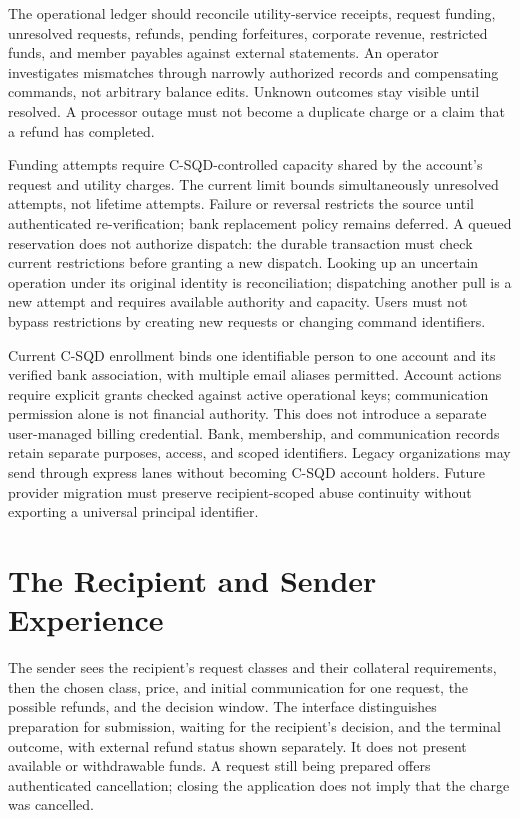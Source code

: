 \documentclass[11pt]{article}
\begin{document}
The operational ledger should reconcile utility-service receipts, request funding,
unresolved requests, refunds,
pending forfeitures, corporate revenue, restricted funds, and member payables
against external statements. An operator investigates mismatches through narrowly
authorized records and compensating commands, not arbitrary balance edits.
Unknown outcomes stay visible until resolved. A processor outage must not become
a duplicate charge or a claim that a refund has completed.

Funding attempts require C-SQD-controlled capacity shared by the account's request
and utility charges. The current limit bounds simultaneously unresolved attempts,
not lifetime attempts. Failure or reversal restricts the source until authenticated
re-verification; bank replacement policy remains deferred. A queued reservation
does not authorize dispatch: the durable transaction must check current
restrictions before granting a new dispatch. Looking up an uncertain operation under its
original identity is reconciliation; dispatching another pull is a new attempt
and requires available authority and capacity. Users must not bypass restrictions
by creating new requests or changing command identifiers.

Current C-SQD enrollment binds one identifiable person to one account and its
verified bank association, with multiple email aliases permitted. Account actions
require explicit grants checked against active operational keys; communication
permission alone is not financial authority. This does not introduce a separate
user-managed billing credential. Bank, membership, and communication records
retain separate purposes, access, and scoped identifiers. Legacy organizations
may send through express lanes without becoming C-SQD account holders. Future
provider migration must preserve recipient-scoped abuse continuity without
exporting a universal principal identifier.

\section{The Recipient and Sender Experience}

The sender sees the recipient's request classes and their collateral requirements,
then the chosen class, price, and initial communication for one request,
the possible refunds, and the decision window. The interface distinguishes preparation for submission, waiting for the
recipient's decision, and the terminal outcome, with external refund status
shown separately. It does not present available or withdrawable funds. A
request still being prepared offers authenticated cancellation; closing the application
does not imply that the charge was cancelled.
\end{document}
